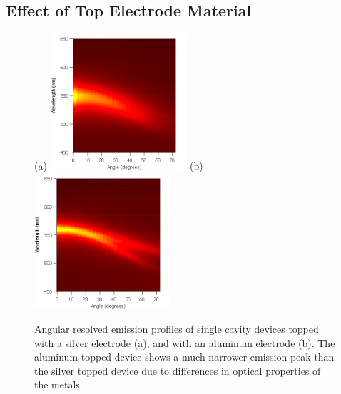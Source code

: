 \documentclass{report}
\begin{document}
        \subsection{Effect of Top Electrode Material} \label{topMaterial}
            \begin{figure}[h!]
                \centering
                (a)
                \includegraphics[width=0.45\textwidth]{images/n1_ag_top_heatmap.png}
                (b)
                \includegraphics[width=0.45\textwidth]{images/n1_al_top_heatmap.png}
                \caption{\small Angular resolved emission profiles of single cavity devices topped with a silver electrode (a), and with an aluminum electrode (b). The aluminum topped device shows a much narrower emission peak than the silver topped device due to differences in optical properties of the metals.}
                \label{fig:topMaterial}
            \end{figure}
\end{document}
